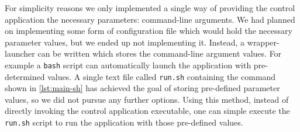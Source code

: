 For simplicity reasons we only implemented a single way of providing the control application the necessary parameters: command-line arguments.
We had planned on implementing some form of configuration file which would hold the necessary parameter values, but we ended up not implementing it.
Instead, a wrapper-launcher can be written which stores the command-line argument values. For example a \verb|bash| script can automatically launch the application with pre-determined values.
A single text file called \verb|run.sh| containing the command shown in \autoref{lst:main-sh} has achieved the goal of storing pre-defined parameter values, so we did not pursue any further options.
Using this method, instead of directly invoking the control application executable, one can simple execute the \verb|run.sh| script to run the application with those pre-defined values.


